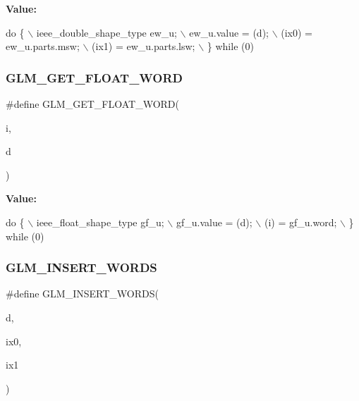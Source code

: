 {\bfseries Value\+:}
\begin{DoxyCode}
\textcolor{keywordflow}{do} \{                                    \(\backslash\)
        ieee\_double\_shape\_type ew\_u;        \(\backslash\)
        ew\_u.value = (d);                   \(\backslash\)
        (ix0) = ew\_u.parts.msw;             \(\backslash\)
        (ix1) = ew\_u.parts.lsw;             \(\backslash\)
    \} \textcolor{keywordflow}{while} (0)
\end{DoxyCode}
\mbox{\label{ulp_8inl_a28d9056369280955e923f99180ccb23c}} 
\subsubsection{\texorpdfstring{G\+L\+M\+\_\+\+G\+E\+T\+\_\+\+F\+L\+O\+A\+T\+\_\+\+W\+O\+RD}{GLM\_GET\_FLOAT\_WORD}}
{\footnotesize\ttfamily \#define G\+L\+M\+\_\+\+G\+E\+T\+\_\+\+F\+L\+O\+A\+T\+\_\+\+W\+O\+RD(\begin{DoxyParamCaption}\item[{}]{i,  }\item[{}]{d }\end{DoxyParamCaption})}

{\bfseries Value\+:}
\begin{DoxyCode}
\textcolor{keywordflow}{do} \{                                    \(\backslash\)
        ieee\_float\_shape\_type gf\_u;         \(\backslash\)
        gf\_u.value = (d);                   \(\backslash\)
        (i) = gf\_u.word;                    \(\backslash\)
    \} \textcolor{keywordflow}{while} (0)
\end{DoxyCode}
\mbox{\label{ulp_8inl_ac4ec14cb5c94f0ca1d594457ee17636f}} 
\subsubsection{\texorpdfstring{G\+L\+M\+\_\+\+I\+N\+S\+E\+R\+T\+\_\+\+W\+O\+R\+DS}{GLM\_INSERT\_WORDS}}
{\footnotesize\ttfamily \#define G\+L\+M\+\_\+\+I\+N\+S\+E\+R\+T\+\_\+\+W\+O\+R\+DS(\begin{DoxyParamCaption}\item[{}]{d,  }\item[{}]{ix0,  }\item[{}]{ix1 }\end{DoxyParamCaption})}

